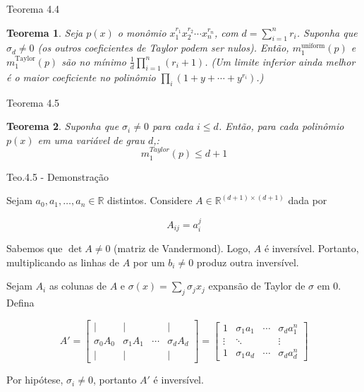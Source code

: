 \documentclass{beamer}
\newtheorem{teo}{Teorema}[section]
\theoremstyle{definition}
\begin{document}
\begin{frame}{Teorema 4.4}
    \begin{teo}
        Seja $p(x)$ o monômio $x_1^{r_1} x_2^{r_2} \cdots x_n^{r_n}$, com $d = \sum_{i=1}^{n} r_i$. Suponha que $\sigma_d \neq 0$ (os outros coeficientes de Taylor podem ser nulos). Então, $m_1^{\text{uniform}}(p)$ e $m_1^{\text{Taylor}}(p)$ são no mínimo $\frac{1}{d} \prod_{i=1}^{n}(r_i + 1)$. (Um limite inferior ainda melhor é o maior coeficiente no polinômio $\prod_i (1 + y + \cdots + y^{r_i})$.)
    \end{teo}
\end{frame}

\begin{frame}{Teorema 4.5}
    \begin{teo}
        Suponha que $\sigma_i \neq 0$ para cada $i \leq d$. Então, para cada polinômio $p(x)$ em uma variável de grau $d$,:
        \begin{equation*}
            m_1^{Taylor}(p) \leq d+1
        \end{equation*}
    \end{teo}
\end{frame}

\begin{frame}{Teo.4.5 - Demonstração}
    \small

    Sejam $a_0, a_1, \dots, a_n \in \mathbb R$ distintos. \pause Considere $A \in \mathbb R^{(d+1) \times (d+1)}$ dada por

    \begin{equation*}
        A_{ij} = a_i^j         
    \end{equation*}

    \pause \vspace{1em}

    Sabemos que $\det A \neq 0$ (matriz de Vandermond). Logo, $A$ é inversível. \pause Portanto, multiplicando as linhas de $A$ por um $b_i\neq 0$ produz outra inversível.

    \pause \vspace{1em}

    Sejam $A_i$ as colunas de $A$ e $\sigma(x) = \sum_j \sigma_j x_j$ expansão de Taylor de $\sigma$ em 0. Defina

    \begin{equation*}
        A' = \begin{bmatrix}
            |  & | & & | \\
            \sigma_0 A_0 & \sigma_1 A_1 & \cdots & \sigma_d A_d \\
            |  & | & & | 
        \end{bmatrix} = 
        \begin{bmatrix}
            1 & \sigma_1 a_1 & \cdots & \sigma_d a_1^n \\
            \vdots & \ddots & &  \vdots \\
            1 & \sigma_1 a_d & \cdots & \sigma_d a_d^n 
        \end{bmatrix}
    \end{equation*}
    
    \pause

    Por hipótese, $\sigma_i \neq 0$, portanto $A'$ é inversível.
\end{frame}
\end{document}

